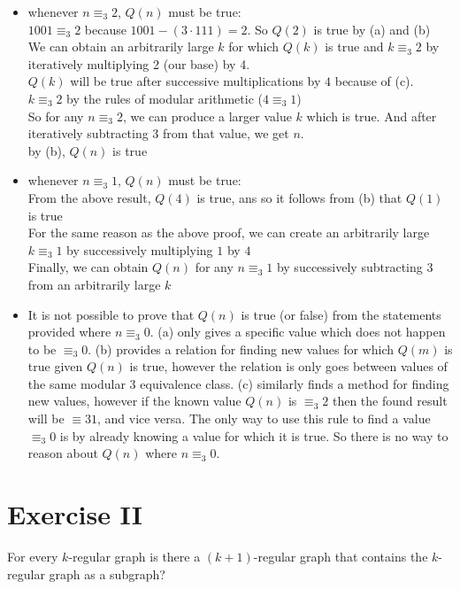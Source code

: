 \documentclass[fontsize=11pt]{scrartcl} %
\numberwithin{equation}{section} %
\numberwithin{figure}{section} %
\numberwithin{table}{section} %
\begin{document}
		\begin{itemize}
			\item whenever $n \equiv_3 2$, $Q(n)$ must be true:\\
			$1001 \equiv_3 2$ because $1001 - (3\cdot111) = 2$.  So $Q(2)$ is true by (a) and (b)\\
			We can obtain an arbitrarily large $k$ for which $Q(k)$ is true and $k \equiv_3 2$ by iteratively multiplying 2 (our base) by 4.  \\
			$Q(k)$ will be true after successive multiplications by $4$ because of (c). \\
			$k \equiv_3 2$ by the rules of modular arithmetic ($4\equiv_3 1$)\\
			So for any $n\equiv_3 2$, we can produce a larger value $k$ which is true.  And after iteratively subtracting 3 from that value, we get $n$.  \\
			by (b), $Q(n)$ is true\\
			
			\item whenever $n \equiv_3 1$, $Q(n)$ must be true:\\
			From the above result, $Q(4)$ is true, ans so it follows from (b) that $Q(1)$ is true\\
			For the same reason as the above proof, we can create an arbitrarily large $k \equiv_3 1$ by successively multiplying $1$ by $4$\\
			Finally, we can obtain $Q(n)$ for any $n \equiv_3 1$ by successively subtracting $3$ from an arbitrarily large $k$\\
			
			\item It is not possible to prove that $Q(n)$ is true (or false) from the statements provided where $n \equiv_3 0$.  (a) only gives a specific value which does not happen to be $\equiv_3 0$.  (b) provides a relation for finding new values for which $Q(m)$ is true given $Q(n)$ is true, however the relation is only goes between values of the same modular 3 equivalence class.  (c) similarly finds a method for finding new values, however if the known value $Q(n)$ is $\equiv_3 2$ then the found result will be $\equiv 3 1$, and vice versa.  The only way to use this rule to find a value $\equiv_3 0$ is by already knowing a value for which it is true.  So there is no way to reason about $Q(n)$ where $n \equiv_3 0$.  
		\end{itemize}

\section*{Exercise II}
	For every $k$-regular graph is there a $(k+1)$-regular graph that contains the $k$-regular graph as a subgraph?\\
	
\end{document}

